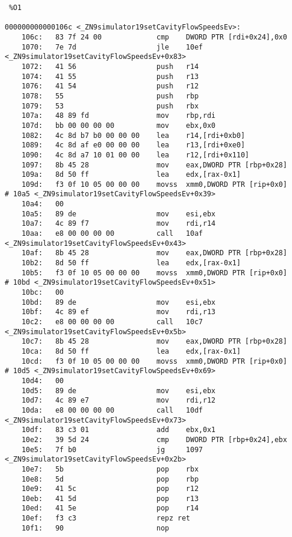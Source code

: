 \begin{verbatim} %O1

000000000000106c <_ZN9simulator19setCavityFlowSpeedsEv>:
    106c:   83 7f 24 00             cmp    DWORD PTR [rdi+0x24],0x0
    1070:   7e 7d                   jle    10ef <_ZN9simulator19setCavityFlowSpeedsEv+0x83>
    1072:   41 56                   push   r14
    1074:   41 55                   push   r13
    1076:   41 54                   push   r12
    1078:   55                      push   rbp
    1079:   53                      push   rbx
    107a:   48 89 fd                mov    rbp,rdi
    107d:   bb 00 00 00 00          mov    ebx,0x0
    1082:   4c 8d b7 b0 00 00 00    lea    r14,[rdi+0xb0]
    1089:   4c 8d af e0 00 00 00    lea    r13,[rdi+0xe0]
    1090:   4c 8d a7 10 01 00 00    lea    r12,[rdi+0x110]
    1097:   8b 45 28                mov    eax,DWORD PTR [rbp+0x28]
    109a:   8d 50 ff                lea    edx,[rax-0x1]
    109d:   f3 0f 10 05 00 00 00    movss  xmm0,DWORD PTR [rip+0x0]        # 10a5 <_ZN9simulator19setCavityFlowSpeedsEv+0x39>
    10a4:   00 
    10a5:   89 de                   mov    esi,ebx
    10a7:   4c 89 f7                mov    rdi,r14
    10aa:   e8 00 00 00 00          call   10af <_ZN9simulator19setCavityFlowSpeedsEv+0x43>
    10af:   8b 45 28                mov    eax,DWORD PTR [rbp+0x28]
    10b2:   8d 50 ff                lea    edx,[rax-0x1]
    10b5:   f3 0f 10 05 00 00 00    movss  xmm0,DWORD PTR [rip+0x0]        # 10bd <_ZN9simulator19setCavityFlowSpeedsEv+0x51>
    10bc:   00 
    10bd:   89 de                   mov    esi,ebx
    10bf:   4c 89 ef                mov    rdi,r13
    10c2:   e8 00 00 00 00          call   10c7 <_ZN9simulator19setCavityFlowSpeedsEv+0x5b>
    10c7:   8b 45 28                mov    eax,DWORD PTR [rbp+0x28]
    10ca:   8d 50 ff                lea    edx,[rax-0x1]
    10cd:   f3 0f 10 05 00 00 00    movss  xmm0,DWORD PTR [rip+0x0]        # 10d5 <_ZN9simulator19setCavityFlowSpeedsEv+0x69>
    10d4:   00 
    10d5:   89 de                   mov    esi,ebx
    10d7:   4c 89 e7                mov    rdi,r12
    10da:   e8 00 00 00 00          call   10df <_ZN9simulator19setCavityFlowSpeedsEv+0x73>
    10df:   83 c3 01                add    ebx,0x1
    10e2:   39 5d 24                cmp    DWORD PTR [rbp+0x24],ebx
    10e5:   7f b0                   jg     1097 <_ZN9simulator19setCavityFlowSpeedsEv+0x2b>
    10e7:   5b                      pop    rbx
    10e8:   5d                      pop    rbp
    10e9:   41 5c                   pop    r12
    10eb:   41 5d                   pop    r13
    10ed:   41 5e                   pop    r14
    10ef:   f3 c3                   repz ret 
    10f1:   90                      nop

\end{verbatim} %

